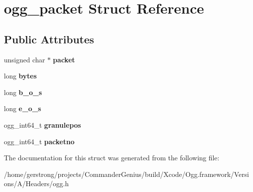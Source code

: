 \hypertarget{structogg__packet}{
\section{ogg\_\-packet Struct Reference}
\label{structogg__packet}
}
\subsection*{Public Attributes}
\begin{DoxyCompactItemize}
\item 
\hypertarget{structogg__packet_a57e7096985ec8766dce415e248767c32}{
unsigned char $\ast$ {\bfseries packet}}
\label{structogg__packet_a57e7096985ec8766dce415e248767c32}

\item 
\hypertarget{structogg__packet_a4438269ce6025d8817865ae66d5881f1}{
long {\bfseries bytes}}
\label{structogg__packet_a4438269ce6025d8817865ae66d5881f1}

\item 
\hypertarget{structogg__packet_adbf12677237d6f5333017de9b59b4ea7}{
long {\bfseries b\_\-o\_\-s}}
\label{structogg__packet_adbf12677237d6f5333017de9b59b4ea7}

\item 
\hypertarget{structogg__packet_aa367e7c5425c5f65cbd126b82dfc72e8}{
long {\bfseries e\_\-o\_\-s}}
\label{structogg__packet_aa367e7c5425c5f65cbd126b82dfc72e8}

\item 
\hypertarget{structogg__packet_a838d9a000e08bae982409bc2734fc566}{
ogg\_\-int64\_\-t {\bfseries granulepos}}
\label{structogg__packet_a838d9a000e08bae982409bc2734fc566}

\item 
\hypertarget{structogg__packet_a60e257b3a8f843135474457197c65a45}{
ogg\_\-int64\_\-t {\bfseries packetno}}
\label{structogg__packet_a60e257b3a8f843135474457197c65a45}

\end{DoxyCompactItemize}


The documentation for this struct was generated from the following file:\begin{DoxyCompactItemize}
\item 
/home/gerstrong/projects/CommanderGenius/build/Xcode/Ogg.framework/Versions/A/Headers/ogg.h\end{DoxyCompactItemize}

